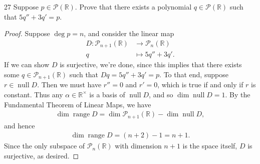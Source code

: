 \documentclass{extarticle}
\newenvironment{problem}[1]{\begin{prob*}{#1}{}}{\end{prob*}}
\newcommand{\R}{\mathbb{R}}
\newcommand{\poly}{\mathcal{P}}
\DeclareMathOperator{\Null}{null}
\DeclareMathOperator{\Range}{range}
\begin{document}
\begin{problem}{27}
Suppose $p\in\poly(\R)$.  Prove that there exists a polynomial $q\in\poly(\R)$ such that $5q'' + 3q' = p$.
\end{problem}
\begin{proof}
Suppose $\deg p =n$, and consider the linear map 
\begin{align*}
D: \poly_{n+1}(\R) &\to \poly_n(\R)\\
            q &\mapsto 5q'' + 3q'.
\end{align*}
If we can show $D$ is surjective, we're done, since this implies that there exists some $q\in\poly_{n+1}(\R)$ such that $Dq = 5q'' + 3q' = p$.  To that end, suppose $r \in\Null D$.  Then we must have $r'' = 0$ and $r' = 0$, which is true if and only if $r$ is constant.  Thus any $\alpha\in\R^\times$ is a basis of $\Null D$, and so $\dim\Null D=1$.  By the Fundamental Theorem of Linear Maps, we have 
\begin{align*}
\dim\Range D  =\dim\poly_{n + 1}(\R) -  \dim\Null D,
\end{align*}
and hence
\begin{align*}
\dim\Range D = (n + 2) - 1 = n + 1.
\end{align*}
Since the only subspace of $\poly_n(\R)$ with dimension $n + 1$ is the space itself, $D$ is surjective, as desired.
\end{proof}
\end{document}
